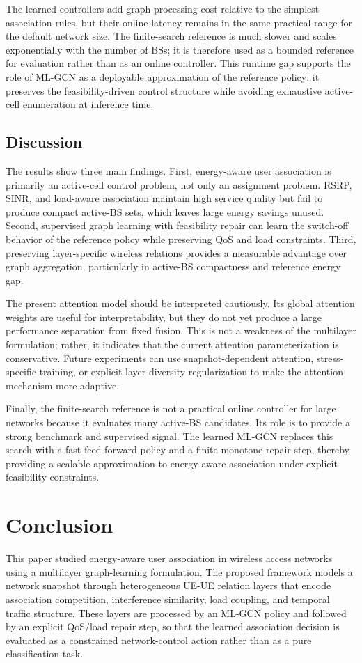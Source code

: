 \documentclass[journal]{IEEEtran}
\begin{document}
The learned controllers add graph-processing cost relative to the simplest
association rules, but their online latency remains in the same practical
range for the default network size. The finite-search reference is much slower
and scales exponentially with the number of BSs; it is therefore used as a
bounded reference for evaluation rather than as an online controller. This
runtime gap supports the role of ML-GCN as a deployable approximation of the
reference policy: it preserves the feasibility-driven control structure while
avoiding exhaustive active-cell enumeration at inference time.

\subsection{Discussion}
The results show three main findings. First, energy-aware user association is
primarily an active-cell control problem, not only an assignment problem. RSRP,
SINR, and load-aware association maintain high service quality but fail to
produce compact active-BS sets, which leaves large energy savings unused.
Second, supervised graph learning with feasibility repair can learn the
switch-off behavior of the reference policy while preserving QoS and load
constraints. Third, preserving layer-specific wireless relations provides a
measurable advantage over graph aggregation, particularly in active-BS
compactness and reference energy gap.

The present attention model should be interpreted cautiously. Its global
attention weights are useful for interpretability, but they do not yet produce
a large performance separation from fixed fusion. This is not a weakness of the
multilayer formulation; rather, it indicates that the current attention
parameterization is conservative. Future experiments can use
snapshot-dependent attention, stress-specific training, or explicit
layer-diversity regularization to make the attention mechanism more adaptive.

Finally, the finite-search reference is not a practical online controller for
large networks because it evaluates many active-BS candidates. Its role is to
provide a strong benchmark and supervised signal. The learned ML-GCN replaces
this search with a fast feed-forward policy and a finite monotone repair step,
thereby providing a scalable approximation to energy-aware association under
explicit feasibility constraints.

\section{Conclusion}
This paper studied energy-aware user association in wireless access networks
using a multilayer graph-learning formulation. The proposed framework models a
network snapshot through heterogeneous UE-UE relation layers that encode
association competition, interference similarity, load coupling, and temporal
traffic structure. These layers are processed by an ML-GCN policy and followed
by an explicit QoS/load repair step, so that the learned association decision
is evaluated as a constrained network-control action rather than as a pure
classification task.
\end{document}
